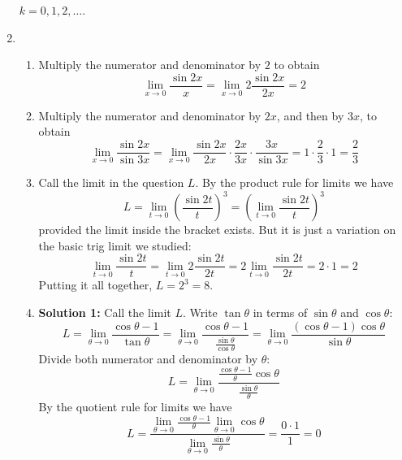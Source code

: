 \documentclass{article}
\begin{document}
\begin{enumerate}
  $k=0,1,2,\ldots$.
\item %
  \begin{enumerate}
  \item %
    Multiply the numerator and denominator by $2$ to obtain
    \begin{equation*}
      \lim_{x\to 0} \frac{\sin 2x}{x}
      = \lim_{x\to 0} 2\frac{\sin 2x}{2x}
      = 2
    \end{equation*}
  \item %
    Multiply the numerator and denominator by $2x$, and then by $3x$, to
    obtain
    \begin{equation*}
      \lim_{x\to 0} \frac{\sin 2x}{\sin 3x}
      = \lim_{x\to 0} \frac{\sin 2x}{2x} \cdot \frac{2x}{3x} \cdot
      \frac{3x}{\sin 3x}
      = 1 \cdot \frac{2}{3} \cdot 1 = \frac{2}{3}
    \end{equation*}
  \item %
    Call the limit in the question $L$.
    By the product rule for limits we have
    \begin{equation*}
      L = \lim_{t\to 0} \left( \frac{\sin 2t}{t} \right)^3
      = \left( \lim_{t\to 0} \frac{\sin 2t}{t} \right)^3
    \end{equation*}
    provided the limit inside the bracket exists.  But it is just a variation
    on the basic trig limit we studied:
    \begin{equation*}
      \lim_{t\to 0} \frac{\sin 2t}{t}
      = \lim_{t\to 0} 2 \frac{\sin 2t}{2t}
      = 2 \lim_{t\to 0} \frac{\sin 2t}{2t}
      = 2 \cdot 1 = 2
    \end{equation*}
    Putting it all together, $L=2^3=8$.
  \item %
    \textbf{Solution 1:} Call the limit $L$.  Write $\tan\theta$ in
    terms of $\sin\theta$ and $\cos\theta$:
    \begin{equation*}
      L
      = \lim_{\theta\to 0} \frac{\cos\theta - 1}{\tan\theta}
      = \lim_{\theta\to 0} \frac{\cos\theta -
        1}{\frac{\sin\theta}{\cos\theta}}
      = \lim_{\theta\to 0} \frac{(\cos\theta-1)\cos\theta}{
        \sin\theta} 
    \end{equation*}
    Divide both numerator and denominator by $\theta$:
    \begin{equation*}
      L = \lim_{\theta\to 0} \frac{\frac{\cos\theta-1}{\theta}
        \cos\theta}{
        \frac{\sin\theta}{\theta}}
    \end{equation*}
    By the quotient rule for limits we have 
    \begin{equation*}
      L = \frac{\lim_{\theta\to 0}\frac{\cos\theta -
          1}{\theta}\lim_{\theta\to 0} \cos\theta}{
        \lim_{\theta\to 0}\frac{\sin\theta}{\theta}}
      = \frac{0 \cdot 1}{1} = 0
    \end{equation*}


\end{enumerate}
\end{enumerate}
\end{document}
